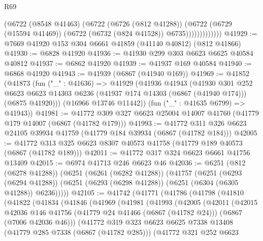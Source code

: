 \begin{lexlean}{R69}
\begin{coremodule}
{                      (@6722
                        (@8548 @41463)
                        (@6722
                          (@6726 (@812 @41288))
                          (@6722
                            (@6729 (@15594 @41469))
                            (@6722 (@6732 (@824 @41528)) @6735)))))))))))))
@41929 := @7669 @41920 @153 @304 @6661 @41859 (@41140 @40812) (@812 @41866)
@41930 := @6828 @41920
@41936 := @41930 @299 @303 @6623 @6625 @40584 @40812
@41937 := @6862 @41920
@41939 := @41937 @169 @40584
@41940 := @6868 @41920
@41943 := @41939 (@6867 (@41940 @169))
@41969 := @41852
    (@41873
      (fun ("_" : @41636) =>
      @41929
        (@41936
          @41943
          (@41930
            @301
            @252
            @6623
            @6623
            @14303
            @6236
            (@41937 @174 @14303 (@6867 (@41940 @174)))
            (@6875 @41920)))
        (@16966 @13746 @11442))
      (fun ("_" : @41635 @6799) => @41943))
@41981 := @41772 @309 @327 @6623 @25004 @14007 @41760 (@41779 @179 @14007 (@6867 (@41782 @179)))
@41993 := @41772 @311 @326 @6623 @24105 @39934 @41759 (@41779 @184 @39934 (@6867 (@41782 @184)))
@42005 := @41772 @313 @325 @6623 @8307 @40573 @41758 (@41779 @189 @40573 (@6867 (@41782 @189)))
@42011 := @41772 @317 @324 @6623 @6661 @41756 @13409
@42015 := @6974 @41713 @246 @6623 @46
@42036 := @6251
    (@812 (@6278 @41288))
    (@6251
      (@6261 (@6282 @41288))
      (@41757
        (@6251
          (@6293 (@6294 @41288))
          (@6251 (@6293 (@6298 @41288)) (@6251 (@6304 (@6305 @41288)) @6236)))))
@42105 := @41742
    (@41771
      (@41786
        (@41798
          (@41810
            (@41822
              (@41834
                (@41846
                  (@41969
                    (@41981
                      (@41993
                        (@42005
                          (@42011
                            (@42015
                              @42036
                              @146
                              @41756
                              (@41779 @24 @41466 (@6867 (@41782 @24)))
                              (@6867 (@7006 @42036 @46)))
                            (@41772
                              @319
                              @323
                              @6623
                              @6625
                              @7338
                              @13408
                              (@41779 @285 @7338 (@6867 (@41782 @285)))
                              (@41772
                                @321
                                @252
                                @6623
}
\end{coremodule}
\end{lexlean}

